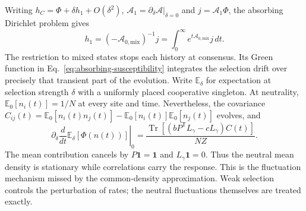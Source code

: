 \documentclass[aps,pre,reprint,amsmath,amssymb,longbibliography]{revtex4-2}
\newcommand{\E}{\mathbb E}
\newcommand{\one}{\bm 1}
\newcommand{\T}{\mathsf T}
\begin{document}
Writing $h_C=\Phi+\delta h_1+O(\delta^2)$,
$\mathcal A_1=\partial_\delta\mathcal A|_{\delta=0}$ and
$j=\mathcal A_1\Phi$, the absorbing Dirichlet problem gives
\begin{equation}
 h_1=(-\mathcal A_{0,\mathrm{mix}})^{-1}j
 =\int_0^\infty e^{t\mathcal A_{0,\mathrm{mix}}}j\,dt .
 \label{eq:absorbing-susceptibility}
\end{equation}
The restriction to mixed states stops each history at consensus. Its
Green function in Eq.~\eqref{eq:absorbing-susceptibility} integrates
the selection drift over precisely that transient part of the evolution. Write $\E_\delta$ for expectation at
selection strength $\delta$ with a uniformly placed cooperative singleton.
At neutrality, $\E_0[n_i(t)]=1/N$ at every site and time. Nevertheless,
the covariance $C_{ij}(t)=\E_0[n_i(t)n_j(t)]-\E_0[n_i(t)]\E_0[n_j(t)]$
evolves, and
\begin{equation}
 \left.\partial_\delta\frac{d}{dt}\E_\delta[\Phi(n(t))]\right|_0
 =\frac{\operatorname{Tr}[(bP^\T L_\gamma-cL_\gamma)C(t)]}{NZ}.
 \label{eq:covariance}
\end{equation}
The mean contribution cancels by $P\one=\one$ and $L_\gamma\one=0$.
Thus the neutral mean density is stationary while correlations carry
the response. This is the fluctuation mechanism missed by the
common-density approximation. Weak selection controls the perturbation
of rates; the neutral fluctuations themselves are treated exactly.
\end{document}
